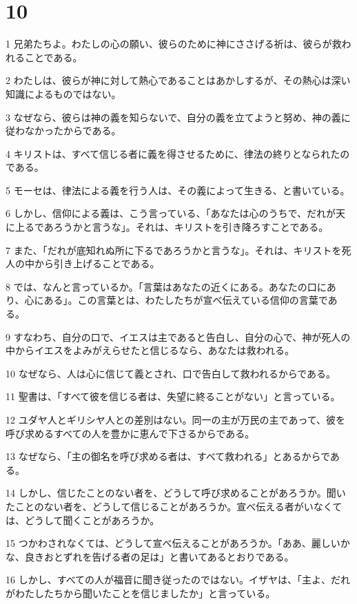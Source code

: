 \chapter{10}

\par 1 兄弟たちよ。わたしの心の願い、彼らのために神にささげる祈は、彼らが救われることである。
\par 2 わたしは、彼らが神に対して熱心であることはあかしするが、その熱心は深い知識によるものではない。
\par 3 なぜなら、彼らは神の義を知らないで、自分の義を立てようと努め、神の義に従わなかったからである。
\par 4 キリストは、すべて信じる者に義を得させるために、律法の終りとなられたのである。
\par 5 モーセは、律法による義を行う人は、その義によって生きる、と書いている。
\par 6 しかし、信仰による義は、こう言っている、「あなたは心のうちで、だれが天に上るであろうかと言うな」。それは、キリストを引き降ろすことである。
\par 7 また、「だれが底知れぬ所に下るであろうかと言うな」。それは、キリストを死人の中から引き上げることである。
\par 8 では、なんと言っているか。「言葉はあなたの近くにある。あなたの口にあり、心にある」。この言葉とは、わたしたちが宣べ伝えている信仰の言葉である。
\par 9 すなわち、自分の口で、イエスは主であると告白し、自分の心で、神が死人の中からイエスをよみがえらせたと信じるなら、あなたは救われる。
\par 10 なぜなら、人は心に信じて義とされ、口で告白して救われるからである。
\par 11 聖書は、「すべて彼を信じる者は、失望に終ることがない」と言っている。
\par 12 ユダヤ人とギリシヤ人との差別はない。同一の主が万民の主であって、彼を呼び求めるすべての人を豊かに恵んで下さるからである。
\par 13 なぜなら、「主の御名を呼び求める者は、すべて救われる」とあるからである。
\par 14 しかし、信じたことのない者を、どうして呼び求めることがあろうか。聞いたことのない者を、どうして信じることがあろうか。宣べ伝える者がいなくては、どうして聞くことがあろうか。
\par 15 つかわされなくては、どうして宣べ伝えることがあろうか。「ああ、麗しいかな、良きおとずれを告げる者の足は」と書いてあるとおりである。
\par 16 しかし、すべての人が福音に聞き従ったのではない。イザヤは、「主よ、だれがわたしたちから聞いたことを信じましたか」と言っている。
